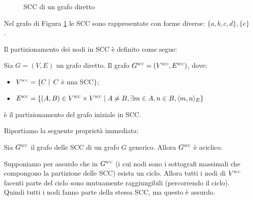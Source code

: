 \begin{example}
    \begin{figure}[t]
        \centering
        \caption{SCC di un grafo diretto}
        \label{fig:graph_cfc_1}
    \end{figure}
    Nel grafo di Figura \ref{fig:graph_cfc_1} le SCC sono rappresentate con forme diverse: $\{a,b,c,d\}, \{e\}$.
\end{example}

Il partizionamento dei nodi in SCC è definito come segue:
\begin{definition} \label{def:scc_partition}
    Sia $G = (V, E)$ un grafo diretto. Il grafo $G^{\superscc} = (V^{\superscc}, E^{\superscc})$, dove:
    \begin{itemize}
        \item $V^{\superscc} = \{C \mid \,C$ è una SCC$\}$;
        \item $E^{\superscc} = \{(A,B) \in V^{\superscc} \times V^{\superscc} \mid A \neq B, \exists m \in A, n \in B, \langle m,n \rangle_E\}$
    \end{itemize}
    è il partizionamento del grafo iniziale in SCC.
\end{definition}

Riportiamo la seguente proprietà immediata:
\begin{proposition}
    Sia $G^{\superscc}$ il grafo delle SCC di un grafo $G$ generico. Allora $G^{\superscc}$ è aciclico.
\end{proposition}
\begin{proof2}
    Supponiamo per assurdo che in $G^{\superscc}$ (i cui nodi sono i sottografi massimali che compongono la partizione delle SCC) esista un ciclo. Allora tutti i nodi di $V^{\superscc}$ facenti parte del ciclo sono mutuamente raggiungibili (percorrendo il ciclo). Quindi tutti i nodi fanno parte della stessa SCC, ma questo è assurdo.
\end{proof2}

